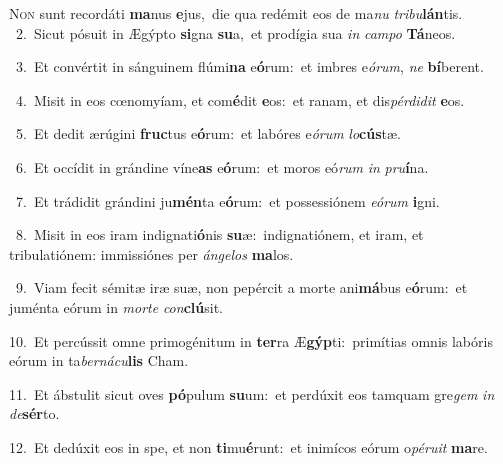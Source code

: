 \lettrine{\initial\textcolor{\initialcolor}{N}}{on} sunt recordáti \textbf{ma}\-nus \textbf{e}\-jus,~\star die qua redémit eos de ma\textit{nu} \textit{tri}\-\textit{bu}\textbf{lán}tis.\\
{\numbfont\textcolor{\numbcolor}{~2.}}~Sicut pósuit in Ægýpto \textbf{si}\-gna \textbf{su}\-a,~\star et prodígia sua \textit{in} \textit{cam}\-\textit{po} \textbf{Tá}\-neos.\par
{\numbfont\textcolor{\numbcolor}{~3.}}~Et convértit in sánguinem flúmi\textbf{na} e\-\textbf{ó}\-rum:~\star et imbres e\-\textit{ó}\-\textit{rum}, \textit{ne} \textbf{bí}\-berent.\par
{\numbfont\textcolor{\numbcolor}{~4.}}~Misit in eos cœnomyíam, et com\-\textbf{é}\-dit \textbf{e}\-os:~\star et ranam, et dis\-\textit{pér}\-\textit{di}\textit{dit} \textbf{e}\-os.\par
{\numbfont\textcolor{\numbcolor}{~5.}}~Et dedit ærúgini \textbf{fruc}\-tus e\-\textbf{ó}\-rum:~\star et labóres e\-\textit{ó}\-\textit{rum} \textit{lo}\-\textbf{cús}tæ.\par
{\numbfont\textcolor{\numbcolor}{~6.}}~Et occídit in grándine víne\textbf{as} e\-\textbf{ó}\-rum:~\star et moros eó\textit{rum} \textit{in} \textit{pru}\-\textbf{í}na.\par
{\numbfont\textcolor{\numbcolor}{~7.}}~Et trádidit grándini ju\-\textbf{mén}\-ta e\-\textbf{ó}\-rum:~\star et possessiónem \textit{e}\-\textit{ó}\textit{rum} \textbf{i}\-gni.\par
{\numbfont\textcolor{\numbcolor}{~8.}}~Misit in eos iram indignati\-\textbf{ó}\-nis \textbf{su}\-æ:~\star indignatiónem, et iram, et tribulatiónem: immissiónes per \textit{án}\-\textit{ge}\textit{los} \textbf{ma}\-los.\par
{\numbfont\textcolor{\numbcolor}{~9.}}~Viam fecit sémitæ iræ suæ, non pepércit a morte ani\-\textbf{má}\-bus e\-\textbf{ó}\-rum:~\star et juménta eórum in \textit{mor}\-\textit{te} \textit{con}\-\textbf{clú}sit.\par
{\numbfont\textcolor{\numbcolor}{10.}}~Et percússit omne primogénitum in \textbf{ter}\-ra Æ\-\textbf{gýp}\-ti:~\star primítias omnis labóris eórum in ta\-\textit{ber}\-\textit{ná}\textit{cu}\textbf{lis} Cham.\par
{\numbfont\textcolor{\numbcolor}{11.}}~Et ábstulit sicut oves \textbf{pó}\-pulum \textbf{su}\-um:~\star et perdúxit eos tamquam gre\textit{gem} \textit{in} \textit{de}\-\textbf{sér}to.\par
{\numbfont\textcolor{\numbcolor}{12.}}~Et dedúxit eos in spe, et non \textbf{ti}\-mu\-\textbf{é}\-runt:~\star et inimícos eórum o\-\textit{pé}\-\textit{ru}\textit{it} \textbf{ma}\-re.\par
